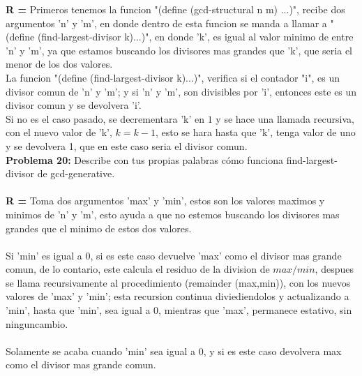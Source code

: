 \documentclass[letterpaper,12pt]{article}
\begin{document}
\textbf{R =} \text Primeros tenemos la funcion "(define (gcd-structural n m) ...)", recibe dos argumentos 'n' y 'm', en donde dentro de esta funcion se manda a llamar a "(define (find-largest-divisor k)...)", en donde 'k', es igual al valor minimo de entre 'n' y 'm', ya que estamos buscando los divisores mas grandes que 'k', que seria el menor de los dos valores.\\
La funcion "(define (find-largest-divisor k)...)", verifica si el contador "i", es un divisor comun de 'n' y 'm'; y si 'n' y 'm', son divisibles por 'i', entonces este es un divisor comun y se devolvera 'i'.\\
Si no es el caso pasado, se decrementara 'k' en $1$ y se hace una llamada recursiva, con el nuevo valor de 'k', $k = k - 1$, esto se hara hasta que 'k', tenga valor de uno y se devolvera 1, que en este caso seria el divisor comun.\\
\newline
\textbf{Problema 20:} \text Describe con tus propias palabras cómo funciona find-largest-divisor de gcd-generative.\\
\\
\textbf{R =} \text Toma dos argumentos 'max' y 'min', estos son los valores maximos y minimos de 'n' y 'm', esto ayuda a que no estemos buscando los divisores mas grandes que el minimo de estos dos valores.\\
\\
Si 'min' es igual a $0$, si es este caso devuelve 'max' como el divisor mas grande comun, de lo contario, este calcula el residuo de la division de $max / min$, despues se llama recursivamente al procedimiento (remainder (max,min)), con los nuevos valores de 'max' y 'min'; esta recursion continua diviediendolos y actualizando a 'min', hasta que 'min', sea igual a $0$, mientras que 'max', permanece estativo, sin ninguncambio.\\
\\
Solamente se acaba cuando 'min' sea igual a $0$, y si es este caso devolvera max como el divisor mas grande comun.
\end{document}
